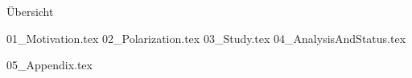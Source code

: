\documentclass[aspectratio=\BeamerAspectRatio]{beamer}
\renewcommand{\maketableofcontents}{\begin{frame}{Übersicht}\tableofcontents[hideallsubsections]\end{frame}}
\begin{document}
\maketitlepage
\maketableofcontents
\makesectionpopup

{01_Motivation.tex}
{02_Polarization.tex}
{03_Study.tex}
{04_AnalysisAndStatus.tex}

\appendix
\AtBeginSection[]{}
{05_Appendix.tex}
\end{document}
